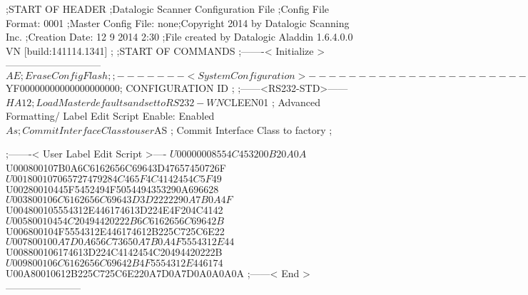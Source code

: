 ;START OF HEADER
;Datalogic Scanner Configuration File
;Config File Format: 0001
;Master Config File: none;Copyright 2014 by Datalogic Scanning Inc.
;Creation Date: 12 9 2014 2:30
;File created by Datalogic Aladdin 1.6.4.0.0 VN [build:141114.1341]
;
;START OF COMMANDS
;-------< Initialize >-----------------------------
$AE                 ; Erase Config Flash
;
;-------< System Configuration >-------------------------------
$YF00000000000000000000; CONFIGURATION ID
;
;------<RS232-STD>------
$HA12               ; Load Master defaults and set to RS232-WN
$CLEEN01            ; Advanced Formatting/ Label Edit Script Enable: Enabled
$As                 ; Commit Interface Class to user
$AS                 ; Commit Interface Class to factory
;

;-------< User Label Edit Script >----
$U00000008554C453200B20A0A
$U000800107B0A6C6162656C69643D47657450726F
$U001800107065727479284C465F4C4142454C5F49
$U00280010445F5452494F5054494353290A696628
$U003800106C6162656C69643D3D2222290A7B0A4F
$U004800105554312E446174613D224E4F204C4142
$U00580010454C20494420222B6C6162656C69642B
$U006800104F5554312E446174612B225C725C6E22
$U007800100A7D0A656C73650A7B0A4F5554312E44
$U008800106174613D224C4142454C20494420222B
$U009800106C6162656C69642B4F5554312E446174
$U00A80010612B225C725C6E220A7D0A7D0A0A0A0A
;------< End >-----------------------
